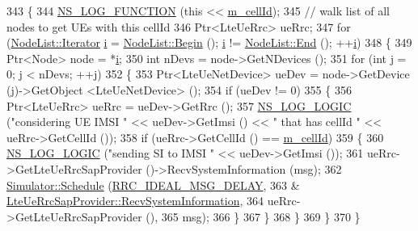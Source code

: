 \begin{DoxyCode}
343 \{
344   \hyperlink{log-macros-disabled_8h_a90b90d5bad1f39cb1b64923ea94c0761}{NS\_LOG\_FUNCTION} (\textcolor{keyword}{this} << \hyperlink{classns3_1_1LteEnbRrcProtocolIdeal_af9f173a13b052d0d1a7c4ee014ae3873}{m\_cellId});
345   \textcolor{comment}{// walk list of all nodes to get UEs with this cellId}
346   Ptr<LteUeRrc> ueRrc;
347   \textcolor{keywordflow}{for} (\hyperlink{classns3_1_1NodeList_a9e2679a94efb4f0066cc21e65440364d}{NodeList::Iterator} \hyperlink{bernuolliDistribution_8m_a6f6ccfcf58b31cb6412107d9d5281426}{i} = \hyperlink{classns3_1_1NodeList_a93d2211831f5cb71d1dbb721e2721d7f}{NodeList::Begin} (); 
      \hyperlink{bernuolliDistribution_8m_a6f6ccfcf58b31cb6412107d9d5281426}{i} != \hyperlink{classns3_1_1NodeList_a027a558c16e6078e25c7ffc67becb559}{NodeList::End} (); ++\hyperlink{bernuolliDistribution_8m_a6f6ccfcf58b31cb6412107d9d5281426}{i})
348     \{
349       Ptr<Node> node = *\hyperlink{bernuolliDistribution_8m_a6f6ccfcf58b31cb6412107d9d5281426}{i};
350       \textcolor{keywordtype}{int} nDevs = node->GetNDevices ();
351       \textcolor{keywordflow}{for} (\textcolor{keywordtype}{int} j = 0; j < nDevs; ++j)
352         \{
353           Ptr<LteUeNetDevice> ueDev = node->GetDevice (j)->GetObject <LteUeNetDevice> ();
354           \textcolor{keywordflow}{if} (ueDev != 0)
355             \{
356               Ptr<LteUeRrc> ueRrc = ueDev->GetRrc ();              
357               \hyperlink{group__logging_ga88acd260151caf2db9c0fc84997f45ce}{NS\_LOG\_LOGIC} (\textcolor{stringliteral}{"considering UE IMSI "} << ueDev->GetImsi () << \textcolor{stringliteral}{" that has cellId "} 
      << ueRrc->GetCellId ());
358               \textcolor{keywordflow}{if} (ueRrc->GetCellId () == \hyperlink{classns3_1_1LteEnbRrcProtocolIdeal_af9f173a13b052d0d1a7c4ee014ae3873}{m\_cellId})
359                 \{       
360                   \hyperlink{group__logging_ga88acd260151caf2db9c0fc84997f45ce}{NS\_LOG\_LOGIC} (\textcolor{stringliteral}{"sending SI to IMSI "} << ueDev->GetImsi ());
361                   ueRrc->GetLteUeRrcSapProvider ()->RecvSystemInformation (msg);
362                   \hyperlink{classns3_1_1Simulator_a671882c894a08af4a5e91181bf1eec13}{Simulator::Schedule} (\hyperlink{namespacens3_a491c1ae41d0f077411ab2b4e7ba7eca7}{RRC\_IDEAL\_MSG\_DELAY}, 
363                                        &
      \hyperlink{classns3_1_1LteUeRrcSapProvider_a34d16c5adabf7ee0caf111fd2b6bfbd3}{LteUeRrcSapProvider::RecvSystemInformation},
364                                        ueRrc->GetLteUeRrcSapProvider (), 
365                                        msg);          
366                 \}             
367             \}
368         \}
369     \} 
370 \}
\end{DoxyCode}



